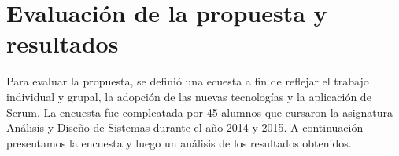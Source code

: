 \section{Evaluación de la propuesta y resultados}\label{resultado}
Para evaluar la propuesta, se definió una ecuesta a fin de reflejar el trabajo individual y grupal, la adopción de las nuevas tecnologías y
la aplicación de Scrum. La encuesta fue compleatada por 45 alumnos que cursaron la asignatura Análisis y Diseño de Sistemas durante el año
 2014 y 2015. A continuación presentamos la encuesta y luego un análisis de los resultados obtenidos.
